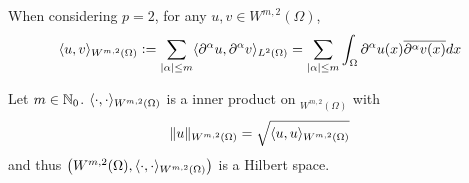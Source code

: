 \noindent When considering $p = 2$, for any $u,v \in W^{m, 2}(\Omega)$,
\begin{equation*}
	\langle u,v \rangle_{W^{m, 2}(\Omega)} \vcentcolon= \sum_{|\alpha| \leq m}\langle \partial^\alpha u, \partial^\alpha v \rangle_{L^2(\Omega)}=\sum_{|\alpha| \leq m} \int_{\Omega} \partial^\alpha u(x) \overline{\partial^\alpha v(x)} d x
\end{equation*}

\begin{thm}
	Let $m \in \mathbb{N}_0$. $\langle \cdot,\cdot \rangle_{W^{m, 2}(\Omega)}$ is a inner product on $_{W^{m, 2}(\Omega)}$ with
	\begin{equation*}
		\|u\|_{W^{m, 2}(\Omega)}=\sqrt{\langle u, u \rangle_{W^{m, 2}(\Omega)}}
	\end{equation*}
	and thus $\left(W^{m, 2}(\Omega),\langle \cdot,\cdot \rangle_{W^{m, 2}(\Omega)}\right)$ is a Hilbert space.
\end{thm}

